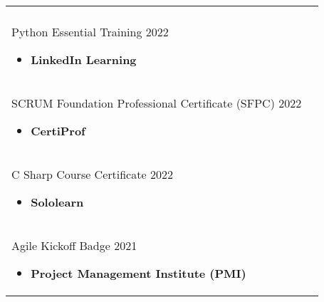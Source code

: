 \documentclass[a4paper,11pt]{article}
\begin{document}
\begin{tabularx}{\linewidth}{@{}l X@{}}
\begin{minipage}[t]{\linewidth}
    
    
    \end{minipage} \\[10px]
    
    \begin{minipage}[t]{\linewidth}
    Python Essential Training  \hfill\normalsize 2022
    
      \begin{itemize}[nosep,after=\strut, leftmargin=1em, itemsep=3pt]
           \item\textbf{\small{LinkedIn Learning}} 
    \end{itemize}
      
    
    
    \end{minipage} \\[10px]
    
    \begin{minipage}[t]{\linewidth}
    SCRUM Foundation Professional Certificate (SFPC)  \hfill\normalsize 2022
    
      \begin{itemize}[nosep,after=\strut, leftmargin=1em, itemsep=3pt]
           \item\textbf{\small{CertiProf}} 
    \end{itemize}
      
    
    
    \end{minipage} \\[10px]
    
    \begin{minipage}[t]{\linewidth}
    C Sharp Course Certificate  \hfill\normalsize 2022
    
      \begin{itemize}[nosep,after=\strut, leftmargin=1em, itemsep=3pt]
           \item\textbf{\small{Sololearn}} 
    \end{itemize}
      
    
    
    \end{minipage} \\[10px]
    
    \begin{minipage}[t]{\linewidth}
    Agile Kickoff Badge  \hfill\normalsize 2021
    
      \begin{itemize}[nosep,after=\strut, leftmargin=1em, itemsep=3pt]
           \item\textbf{\small{Project Management Institute (PMI)}} 
    \end{itemize}
      

\end{minipage}
\end{tabularx}
\end{document}
